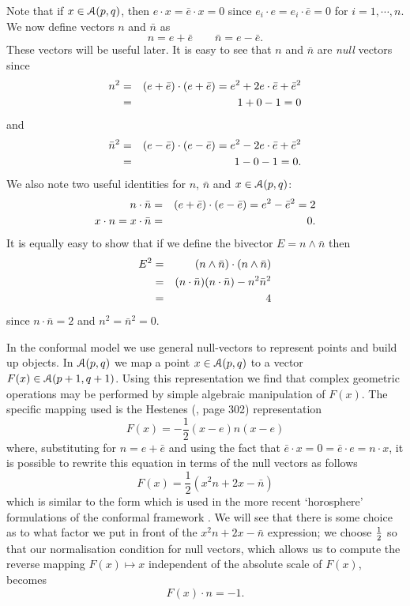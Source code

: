 Note that if $x \in {\mathcal{A}}(p,q)$, then $e\cdot x =
\bar{e}\cdot x = 0$ since $e_i\cdot e=e_i \cdot \bar{e} = 0$
for $i=1,\cdots,n$. We now define vectors $n$ and
$\bar{n}$ as
%
\[ n = e + \bar{e}  \qquad  \bar{n} = e - \bar{e}.
\label{nequations}
\]
These vectors will be useful later. It is easy to see that
$n$ and $\bar{n}$ are \emph{null} vectors since
%
\begin{eqnarray}
n^2  & = & (e + \bar{e})\cdot(e + \bar{e}) = e^2 + 2e\cdot\bar{e} + \bar{e}^2 \nonumber \\
       & = &  1 + 0 - 1 = 0  \nonumber
\end{eqnarray}
and
\begin{eqnarray}
\bar{n}^2  & = & (e - \bar{e})\cdot(e - \bar{e}) = e^2 - 2e\cdot\bar{e} + \bar{e}^2 \nonumber \\
       & = &  1 - 0 - 1 = 0.     \nonumber
\end{eqnarray}
%
We also note two useful identities for $n$, $\bar{n}$ and $x \in \mathcal{A}(p,q)$:
%
\begin{eqnarray}
n\cdot\bar{n} & = & (e + \bar{e})\cdot(e - \bar{e}) = e^2 - \bar{e}^2 = 2 \nonumber \\
x\cdot n = x\cdot \bar{n} & = & 0. \nonumber 
\end{eqnarray}
%
It is equally easy to show that if we define the bivector $E = n \wedge \bar{n}$ 
then
%
\begin{eqnarray}
  E^2 & = &  (n\wedge \bar{n})\cdot(n\wedge \bar{n}) \nonumber \\
  & = &  (n\cdot\bar{n})(n\cdot\bar{n}) - n^2 \bar{n}^2 \nonumber \\
  & = &  4
  \end{eqnarray}
since $n\cdot\bar{n}=2$ and $n^2=\bar{n}^2=0$.

In the conformal model we use general null-vectors to represent points and 
build up objects.
In $\mathcal{A}(p,q)$ we map a point $x \in \mathcal{A}(p,q)$ to a vector
$F(x) \in \mathcal{A}(p+1,q+1)$. Using this representation we find that 
complex geometric operations may be performed
by simple algebraic manipulation of $F(x)$. The specific mapping
used is the Hestenes (\cite{hestenes}, page 302) representation
%
\begin{equation}
F(x)=-\frac{1}{2}(x-e)n(x-e)
\end{equation}
%
where, substituting for $n=e+\bar{e}$ and using the fact that
$\bar{e}\cdot x = 0 = \bar{e}\cdot e = n\cdot x$, it is possible
to rewrite this equation in terms of the null
vectors as follows
%
\begin{equation}
  F(x) = \frac{1}{2}(x^2n + 2x - \bar{n})
\end{equation}
%
which is similar to the form which is used in the more recent
`horosphere' formulations of the conformal framework
\cite{oldwine}. We will see that there is some choice as
to what factor we put in front of the $x^2n + 2x -
\bar{n}$ expression; we choose $\frac{1}{2}$ so that our
normalisation condition for null vectors, which allows us to
compute the reverse mapping $F(x) \mapsto x$ independent of the
absolute scale of $F(x)$, becomes
%
\[ F(x)\cdot n = -1.  \]
%

